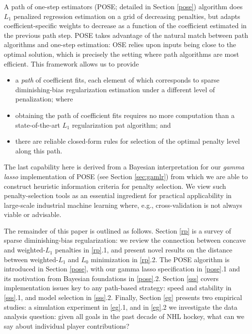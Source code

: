 \documentclass[twoside]{article}
\begin{document}
A path of one-step estimators (POSE; detailed in Section \ref{pose})
algorithm does $L_1$ penalized regression estimation on a grid of decreasing
penalties, but adapts coefficient-specific weights to decrease as a function
of the coefficient estimated in the previous path step.  POSE takes advantage
of the natural match between path algorithms and one-step estimation: OSE
relies upon inputs being close to the optimal solution, which is precisely the
setting where path algorithms are most efficient.  This framework allows us to provide 
\begin{itemize}
\item a {\it path} of coefficient fits, each element of which corresponds to sparse diminishing-bias regularization estimation under a different level of penalization; where
\item obtaining the path of coefficient fits requires no more computation than  a state-of-the-art $L_1$ regularization pat algorithm; and
\item there are reliable closed-form rules for selection of the optimal penalty level along this path.
\end{itemize}
The last capability here is derived from a Bayesian interpretation for our \textit{gamma lasso} implementation of POSE (see Section \ref{sec:gamlr}) from which we are able to construct heuristic information criteria for penalty selection.
We view such penalty-selection tools as an essential ingredient for practical applicability in large-scale industrial machine learning where, e.g., cross-validation is not always viable or advisable.


The remainder of this paper is outlined as follows.  Section \ref{rp} is a
survey of sparse diminishing-bias regularization: we review the connection
between concave and weighted-$L_1$ penalties in
\ref{rp}.1, and present novel results on the distance between weighted-$L_1$
 and $L_0$ minimization in \ref{rp}.2. The POSE algorithm is introduced in
Section \ref{pose}, with our  gamma lasso specification in \ref{pose}.1 and its motivation from Bayesian foundations in \ref{pose}.2.  Section \ref{sss}  covers
implementation issues key to any path-based strategy:  speed and stability
in \ref{sss}.1, and model selection  in \ref{sss}.2.  Finally, Section
\ref{eg} presents two empirical studies:
a  simulation experiment in \ref{eg}.1, and in \ref{eg}.2 we investigate the data analysis question: given all goals in the past decade of NHL hockey, what can we say about individual player contributions? 
\end{document}
